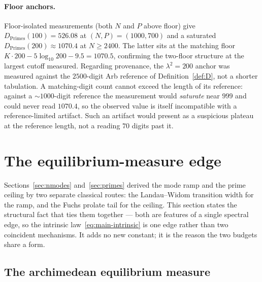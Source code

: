 \documentclass[11pt,a4paper]{article}
\begin{document}
\paragraph{Floor anchors.}
Floor-isolated measurements (both $N$ and $P$ above floor) give
$D_{\mathrm{Primes}}(100)=526.08$ at $(N,P)=(1000,700)$ and a saturated
$D_{\mathrm{Primes}}(200)\approx1070.4$ at $N\ge2400$. The latter sits at the
matching floor $K\cdot200-5\log_{10}200-9.5=1070.5$, confirming the two-floor
structure at the largest cutoff measured. Regarding provenance, the $\lambda^2=200$
anchor was measured against the $2500$-digit Arb reference of
Definition~\ref{def:D}, not a shorter tabulation. A matching-digit count cannot exceed
the length of its reference: against a $\sim1000$-digit reference the
measurement would \emph{saturate} near $999$ and could never read
$1070.4$, so the observed value is itself incompatible with a
reference-limited artifact. Such an artifact would present as a suspicious
plateau at the reference length, not a reading $70$ digits past it.

\section{The equilibrium-measure edge}\label{sec:equilibrium}

Sections~\ref{sec:nmodes} and~\ref{sec:primes} derived the mode ramp and the
prime ceiling by two separate classical routes: the Landau--Widom transition
width for the ramp, and the Fuchs prolate tail for the ceiling. This section
states the structural fact that ties them together --- both are features of a
single spectral edge, so the intrinsic law~\eqref{eq:main-intrinsic} is one
edge rather than two coincident mechanisms. It adds no new constant; it is the
reason the two budgets share a form.

\subsection{The archimedean equilibrium measure}\label{ssec:eqmeasure}
\end{document}
